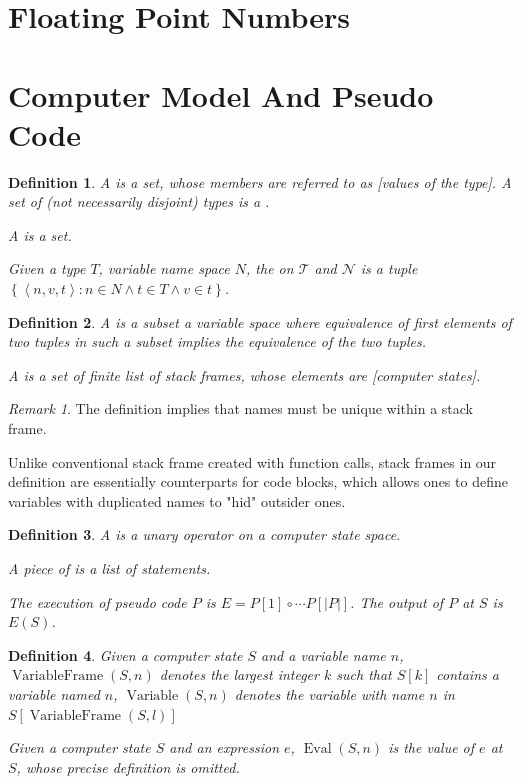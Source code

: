 \documentclass{book}
\newtheorem{definition}{Definition}
\theoremstyle{definition}\newtheorem{mechanism}{Mechanism}
\theoremstyle{remark}\newtheorem*{remark}{Remark}
\begin{document}
\section{Floating Point Numbers}

\section{Computer Model And Pseudo Code}

\begin{definition}
	A  is a set, whose members are referred to as [values of the type]. A set of (not necessarily disjoint) types is a .
	
	A  is a set.
	
	Given a type $T$, variable name space $N$, the  on $\mathcal T$ and $\mathcal N$ is a tuple $\left\{\left<n, v, t\right>: n\in N \land t \in T \land v\in t\right\}$.
\end{definition}

\begin{definition}
	A  is a subset a variable space where equivalence of first elements of two tuples in such a subset implies the equivalence of the two tuples.
	
	A  is a set of finite list of stack frames, whose elements are [computer states].
\end{definition}

\begin{remark}
	The definition implies that names must be unique within a stack frame.
	
	Unlike conventional stack frame created with function calls, stack frames in our definition are essentially counterparts for code blocks, which allows ones to define variables with duplicated names to "hid" outsider ones.
\end{remark}

\begin{definition}
	A  is a unary operator on a computer state space.
	
	A piece of  is a list of statements.
	
	The execution of pseudo code $P$ is $E = P[1] \circ \cdots P[|P|]$. The output of $P$ at $S$ is $E(S)$.
\end{definition}

\begin{definition}
	Given a computer state $S$ and a variable name $n$, $\operatorname{VariableFrame}(S, n)$ denotes the largest integer $k$ such that $S[k]$ contains a variable named $n$, $\operatorname{Variable}(S, n)$ denotes the variable with name $n$ in $S[\operatorname{VariableFrame}(S, l)]$
	
	Given a computer state $S$ and an expression $e$, $\operatorname{Eval}(S, n)$ is the value of $e$ at $S$, whose precise definition is omitted.
\end{definition}
\end{document}
